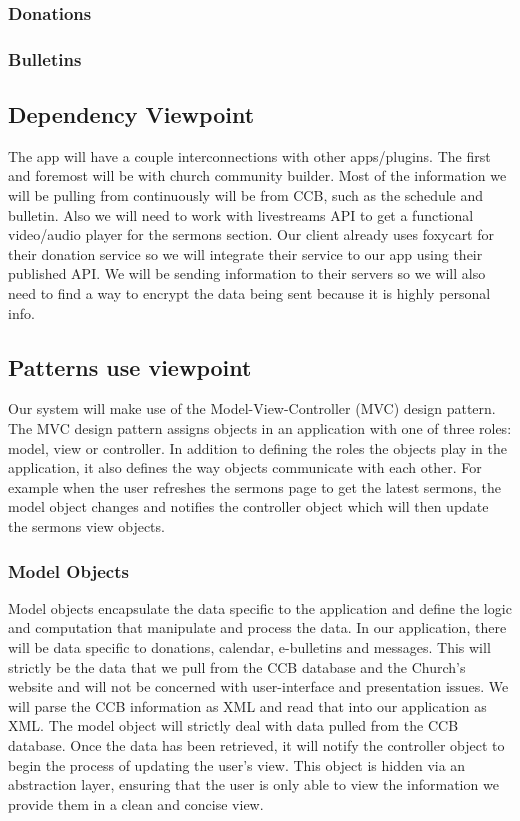 \documentclass[letterpaper,10pt,draftclsnofoot,onecolumn,titlepage]{IEEEtran}
\begin{document}
			\subsubsection{Donations}

			\subsubsection{Bulletins}


		\subsection{Dependency Viewpoint}
			The app will have a couple interconnections with other apps/plugins.
			The first and foremost will be with church community builder.
			Most of the information we will be pulling from continuously will be from CCB, such as the schedule and bulletin.
			Also we will need to work with livestreams API to get a functional video/audio player for the sermons section.
			Our client already uses foxycart for their donation service so we will integrate their service to our app using their published API.
			We will be sending information to their servers so we will also need to find a way to encrypt the data being sent because it is highly personal info.

		\subsection{Patterns use viewpoint}
			Our system will make use of the Model-View-Controller (MVC) design pattern.
			The MVC design pattern assigns objects in an application with one of three roles: model, view or controller.
			In addition to defining the roles the objects play in the application, it also defines the way objects communicate with each other.
			For example when the user refreshes the sermons page to get the latest sermons, the model object changes and notifies the controller object which will then update the sermons view objects.

			\subsubsection{Model Objects}
				Model objects encapsulate the data specific to the application and define the logic and computation that manipulate and process the data.
				In our application, there will be data specific to donations, calendar, e-bulletins and messages.
				This will strictly be the data that we pull from the CCB database and the Church's website and will not be concerned with user-interface and presentation issues.
				We will parse the CCB information as XML and read that into our application as XML.
				The model object will strictly deal with data pulled from the CCB database.
				Once the data has been retrieved, it will notify the controller object to begin the process of updating the user's view.
				This object is hidden via an abstraction layer, ensuring that the user is only able to view the information we provide them in a clean and concise view.
\end{document}
